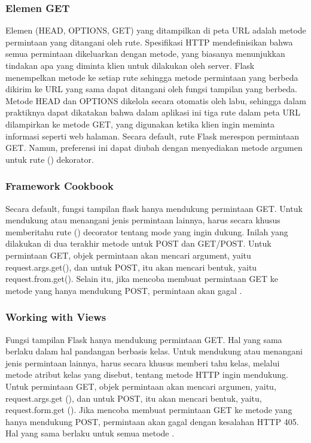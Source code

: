 \subsubsection{Elemen GET}
Elemen (HEAD, OPTIONS, GET) yang ditampilkan di peta URL adalah metode permintaan yang ditangani oleh rute. Spesifikasi HTTP mendefinisikan bahwa semua permintaan dikeluarkan dengan metode, yang biasanya menunjukkan tindakan apa yang diminta klien untuk dilakukan oleh server. Flask menempelkan metode ke setiap rute sehingga metode permintaan yang berbeda dikirim ke URL yang sama dapat ditangani oleh fungsi tampilan yang berbeda.
Metode HEAD dan OPTIONS dikelola secara otomatis oleh labu, sehingga dalam praktiknya dapat dikatakan bahwa dalam aplikasi ini tiga rute dalam peta URL dilampirkan ke metode GET, yang digunakan ketika klien ingin meminta informasi seperti web halaman. Secara default, rute Flask merespon permintaan GET. Namun, preferensi ini dapat diubah dengan menyediakan metode argumen untuk rute () dekorator\cite{grinberg2018flask}.
\subsubsection{Framework Cookbook}
Secara default, fungsi tampilan flask hanya mendukung permintaan GET. Untuk mendukung atau menangani jenis permintaan lainnya, harus secara khusus memberitahu rute () decorator tentang mode yang ingin dukung. Inilah yang dilakukan di dua terakhir metode untuk POST dan GET/POST. Untuk permintaan GET, objek permintaan akan mencari argument, yaitu request.args.get(), dan untuk POST, itu akan mencari bentuk, yaitu request.from.get(). Selain itu, jika mencoba membuat permintaan GET ke metode yang hanya mendukung POST, permintaan akan gagal \cite{aggarwal2014flask}.
\subsubsection{Working with Views}
Fungsi tampilan Flask hanya mendukung permintaan GET. Hal yang sama berlaku dalam hal pandangan berbasis kelas. Untuk mendukung atau menangani jenis permintaan lainnya, harus secara khusus memberi tahu kelas, melalui metode atribut kelas yang disebut, tentang metode HTTP ingin mendukung. Untuk permintaan GET, objek permintaan akan mencari argumen, yaitu, request.args.get (), dan untuk POST, itu akan mencari bentuk, yaitu, request.form.get (). Jika mencoba membuat permintaan GET ke metode yang hanya mendukung POST, permintaan akan gagal dengan kesalahan HTTP 405. Hal yang sama berlaku untuk semua metode \cite{aggarwal2014flask}.
